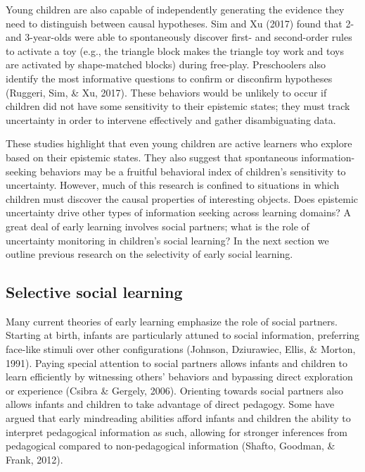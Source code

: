 \documentclass[a4paper,man,apacite,floatsintext]{apa6}
\begin{document}
Young children are also capable of independently generating the evidence
they need to distinguish between causal hypotheses. Sim and Xu (2017)
found that 2- and 3-year-olds were able to spontaneously discover first-
and second-order rules to activate a toy (e.g., the triangle block makes
the triangle toy work and toys are activated by shape-matched blocks)
during free-play. Preschoolers also identify the most informative
questions to confirm or disconfirm hypotheses (Ruggeri, Sim, \& Xu,
2017). These behaviors would be unlikely to occur if children did not
have some sensitivity to their epistemic states; they must track
uncertainty in order to intervene effectively and gather disambiguating
data.

These studies highlight that even young children are active learners who
explore based on their epistemic states. They also suggest that
spontaneous information-seeking behaviors may be a fruitful behavioral
index of children's sensitivity to uncertainty. However, much of this
research is confined to situations in which children must discover the
causal properties of interesting objects. Does epistemic uncertainty
drive other types of information seeking across learning domains? A
great deal of early learning involves social partners; what is the role
of uncertainty monitoring in children's social learning? In the next
section we outline previous research on the selectivity of early social
learning.

\subsection{Selective social learning}\label{selective-social-learning}

Many current theories of early learning emphasize the role of social
partners. Starting at birth, infants are particularly attuned to social
information, preferring face-like stimuli over other configurations
(Johnson, Dziurawiec, Ellis, \& Morton, 1991). Paying special attention
to social partners allows infants and children to learn efficiently by
witnessing others' behaviors and bypassing direct exploration or
experience (Csibra \& Gergely, 2006). Orienting towards social partners
also allows infants and children to take advantage of direct pedagogy.
Some have argued that early mindreading abilities afford infants and
children the ability to interpret pedagogical information as such,
allowing for stronger inferences from pedagogical compared to
non-pedagogical information (Shafto, Goodman, \& Frank, 2012).
\end{document}
